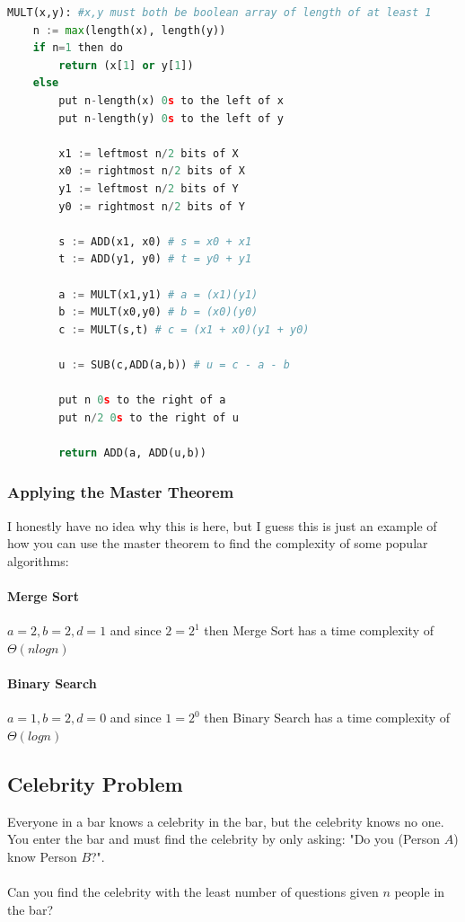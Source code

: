 \documentclass[12pt]{article}
\begin{document}
\begin{lstlisting}[language=Python]
MULT(x,y): #x,y must both be boolean array of length of at least 1
	n := max(length(x), length(y))
	if n=1 then do
		return (x[1] or y[1])
	else
		put n-length(x) 0s to the left of x
		put n-length(y) 0s to the left of y
		
		x1 := leftmost n/2 bits of X
		x0 := rightmost n/2 bits of X
		y1 := leftmost n/2 bits of Y
		y0 := rightmost n/2 bits of Y
		
		s := ADD(x1, x0) # s = x0 + x1
		t := ADD(y1, y0) # t = y0 + y1
		
		a := MULT(x1,y1) # a = (x1)(y1)
		b := MULT(x0,y0) # b = (x0)(y0)
		c := MULT(s,t) # c = (x1 + x0)(y1 + y0)
		
		u := SUB(c,ADD(a,b)) # u = c - a - b
		
		put n 0s to the right of a
		put n/2 0s to the right of u
		
		return ADD(a, ADD(u,b))
\end{lstlisting}

\subsubsection{Applying the Master Theorem}

I honestly have no idea why this is here, but I guess this is just an example of how you can use the master theorem to find the complexity of some popular algorithms:

\paragraph{Merge Sort} $a=2, b=2, d=1$ and since $2 = 2^1$ then Merge Sort has a time complexity of $\Theta (nlogn)$

\paragraph{Binary Search} $a=1, b=2, d=0$ and since $1 = 2^0$ then Binary Search has a time complexity of $\Theta (logn)$

\subsection{Celebrity Problem}

Everyone in a bar knows a celebrity in the bar, but the celebrity knows no one. You enter the bar and must find the celebrity by only asking: "Do you (Person $A$) know Person $B$?".\\
\\
Can you find the celebrity with the least number of questions given $n$ people in the bar?
\end{document}

